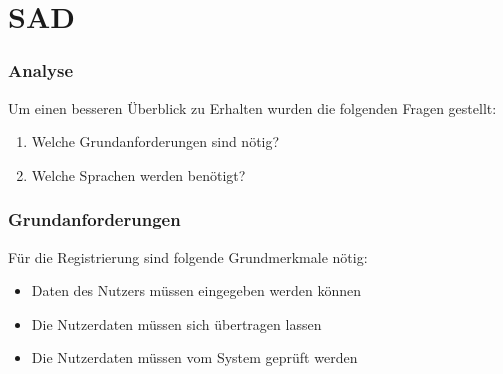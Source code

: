 \section{SAD}
\begin{frame} %
  \frametitle{Analyse} %

  Um einen besseren Überblick zu Erhalten wurden die folgenden Fragen gestellt:
  \bigskip
  \begin{enumerate}
   \item Welche Grundanforderungen sind nötig?
   \item Welche Sprachen werden benötigt?
  \end{enumerate}

\end{frame}

\begin{frame} %
  \frametitle{Grundanforderungen} %

   Für die Registrierung sind folgende Grundmerkmale nötig:
   \bigskip
   \begin{itemize}
    \item Daten des Nutzers müssen eingegeben werden können
    \item Die Nutzerdaten müssen sich übertragen lassen
    \item Die Nutzerdaten müssen vom System geprüft werden
   \end{itemize}

\end{frame}


